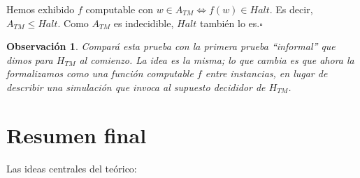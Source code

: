 \documentclass[11pt,a4paper]{article}
\theoremstyle{definicion}
\newtheorem{observacion}[definicion]{Observación}
\begin{document}
Hemos exhibido $f$ computable con $w \in A_{TM} \iff f(w) \in Halt$. Es decir, $A_{TM} \leq Halt$. Como $A_{TM}$ es indecidible, $Halt$ también lo es.\hfill$\square$

\begin{observacion}
Compará esta prueba con la primera prueba ``informal'' que dimos para $H_{TM}$ al comienzo. La idea es la misma; lo que cambia es que ahora la formalizamos como una función computable $f$ entre instancias, en lugar de describir una simulación que invoca al supuesto decididor de $H_{TM}$.
\end{observacion}

\section{Resumen final}

Las ideas centrales del teórico:
\end{document}
